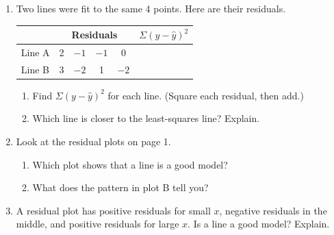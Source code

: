 \documentclass[11pt]{article}
\newcommand{\blank}[1]{\ans{#1}}
\begin{document}
\begin{enumerate}
\work{4em}

\newpage
\item Two lines were fit to the same 4 points. Here are their residuals.

\begin{center}
\renewcommand{\arraystretch}{1.4}
\begin{tabular}{|l|c|c|c|c|p{1.2in}|}\hline
 & \multicolumn{4}{c|}{Residuals} & $\Sigma(y - \hat{y})^2$ \\ \hline
Line A & 2 & $-1$ & $-1$ & 0 & \blank{$4 + 1 + 1 + 0 = 6$} \\ \hline
Line B & 3 & $-2$ & 1 & $-2$ & \blank{$9 + 4 + 1 + 4 = 18$} \\ \hline
\end{tabular}
\end{center}
\begin{enumerate}[itemsep=1.4em]
  \item Find $\Sigma(y - \hat{y})^2$ for each line. (Square each residual, then add.)
  \item Which line is closer to the least-squares line? Explain. 
\end{enumerate}
\work{2em}

\item Look at the residual plots on page 1.
\begin{enumerate}[itemsep=1.4em]
  \item Which plot shows that a line is a good model? 
  \item What does the pattern in plot B tell you? 
\end{enumerate}
\work{1.5em}

\item A residual plot has positive residuals for small $x$, negative residuals in the middle, and positive residuals for large $x$. Is a line a good model? Explain.


\end{enumerate}
\end{document}
